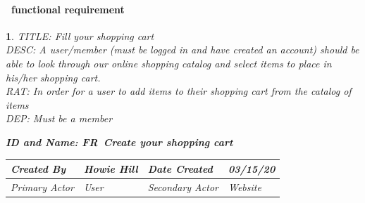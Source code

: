\documentclass{scrreprt}
\theoremstyle{funreq}
\newtheorem{funreq}{}
\begin{document}
	\paragraph[]{\Subsectionname ~functional requirement }
	\begin{funreq}
		
		\label{cart_add}
		TITLE: Fill your shopping cart\\
		DESC: A user/member (must be logged in and have created an account) should be able to look through our online shopping catalog and select items to place in his/her shopping cart. \\
		RAT: In order for a user to add items to their shopping cart from the catalog of items\\
		DEP: Must be a member\\
		

		\begin{table}[H]
		\begin{flushleft}\bfseries{ID and Name: FR\thefunreq ~\hspace{.6cm}Create your shopping cart}\end{flushleft}
			\begin{tabularx}{\columnwidth}{|X|X|X|X|}
				\hline
				Created By    & Howie Hill & Date Created    & 03/15/20 \\ \hline
				Primary Actor & User        & Secondary Actor & Website \\ \hline
			\end{tabularx}
		
\end{table}
\end{funreq}
\end{document}
